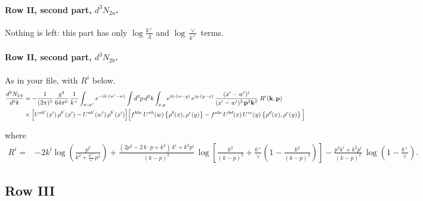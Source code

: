 \documentclass[10pt]{article}
\numberwithin{equation}{section}
\begin{document}
\paragraph{Row II, second part, $d^3N_{2a}$.}
Nothing is left: this part has only $\log\frac{k^+}{\Lambda}$ and $\log\frac{\vee}{k^+}$ terms.
\paragraph{Row II, second part, $d^3N_{2b}$.}
As in your file, with $R^i$ below.
\begin{align}
\frac{d^{3}N_{2\,b}}{d^{3}k} & =  -\frac{1}{(2\pi)^{3}}\,\frac{g^{4}}{64\pi^{6}}\,\frac{1}{k^{+}}\int_{w,w'} e^{-ik\cdot(w'-w)}
\int d^{2}p\,d^{2}k\int_{x,y} e^{ik\cdot(w-y)}\,e^{ip\cdot(y-x)}\,\frac{(x'-w')^{i}}{(x'-w')^{2}\,\mathbf{p}^{2}\mathbf{k}^{2}}\;R^{i}(\mathbf{k},\mathbf{p})\notag\\
&\times\Big[U^{ab'}(x')\,\rho^{b'}(x')-U^{ab'}(w')\,\rho^{b'}(x')\Big]
\Big[f^{hbc}\,U^{ah}(w)\left\{\rho^{b}(x),\rho^{c}(y)\right\}-f^{abc}\,U^{bd}(x)\,U^{ce}(y)\left\{\rho^{d}(x),\rho^{e}(y)\right\}\Big] \label{eq:R:G1II2b}
\end{align}

where
\begin{align}
R^{i} =& -2k^{i}\log\left(\frac{p^{2}}{k^{2}+\frac{k^{+}}{\vee}\,p^{2}}\right)
+\frac{(2p^{2}-2\,k\cdot p+k^{2})\,k^{i}+k^{2}p^{i}}{(k-p)^{2}}\,
\log\left[\frac{k^{2}}{(k-p)^{2}}+\frac{k^{+}}{\vee}\left(1-\frac{k^{2}}{(k-p)^{2}}\right)\right]
-\frac{p^{2}k^{i}+k^{2}p^{i}}{(k-p)^{2}}\,\log\left(1-\frac{k^{+}}{\vee}\right).
\end{align}
\subsection{Row III}
\end{document}
